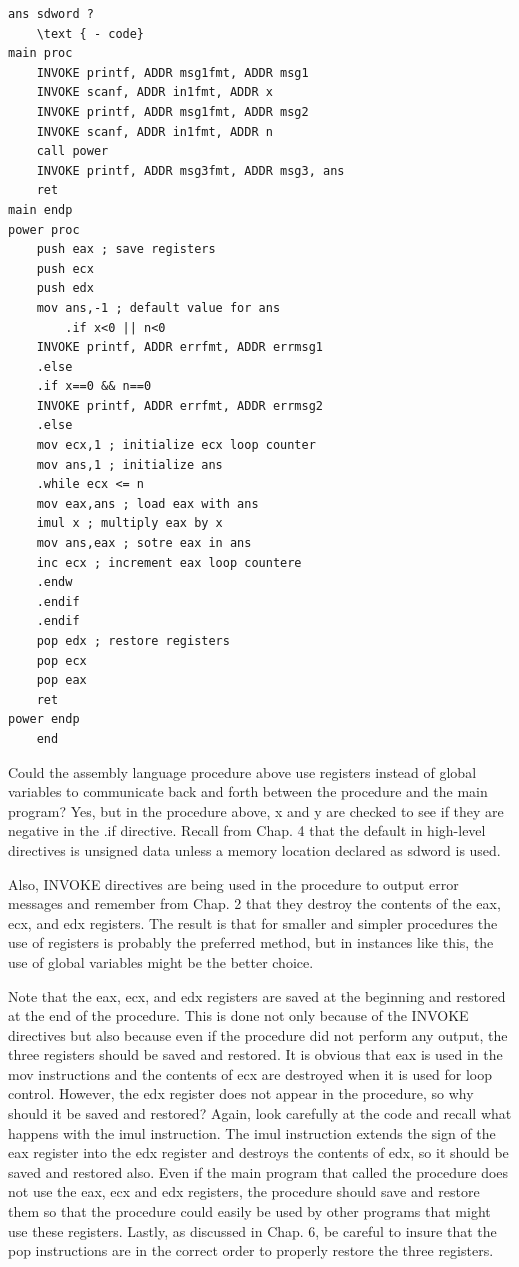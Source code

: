 \documentclass[10pt]{book}
\begin{document}
\begin{verbatim}
ans sdword ?
    \text { - code}
main proc
    INVOKE printf, ADDR msg1fmt, ADDR msg1
    INVOKE scanf, ADDR in1fmt, ADDR x
    INVOKE printf, ADDR msg1fmt, ADDR msg2
    INVOKE scanf, ADDR in1fmt, ADDR n
    call power
    INVOKE printf, ADDR msg3fmt, ADDR msg3, ans
    ret
main endp
power proc
    push eax ; save registers
    push ecx
    push edx
    mov ans,-1 ; default value for ans
        .if x<0 || n<0
    INVOKE printf, ADDR errfmt, ADDR errmsg1
    .else
    .if x==0 && n==0
    INVOKE printf, ADDR errfmt, ADDR errmsg2
    .else
    mov ecx,1 ; initialize ecx loop counter
    mov ans,1 ; initialize ans
    .while ecx <= n
    mov eax,ans ; load eax with ans
    imul x ; multiply eax by x
    mov ans,eax ; sotre eax in ans
    inc ecx ; increment eax loop countere
    .endw
    .endif
    .endif
    pop edx ; restore registers
    pop ecx
    pop eax
    ret
power endp
    end
\end{verbatim}

Could the assembly language procedure above use registers instead of global variables to communicate back and forth between the procedure and the main program? Yes, but in the procedure above, x and y are checked to see if they are negative in the .if directive. Recall from Chap. 4 that the default in high-level directives is unsigned data unless a memory location declared as sdword is used.

Also, INVOKE directives are being used in the procedure to output error messages and remember from Chap. 2 that they destroy the contents of the eax, ecx, and edx registers. The result is that for smaller and simpler procedures the use of registers is probably the preferred method, but in instances like this, the use of global variables might be the better choice.

Note that the eax, ecx, and edx registers are saved at the beginning and restored at the end of the procedure. This is done not only because of the INVOKE directives but also because even if the procedure did not perform any output, the three registers should be saved and restored. It is obvious that eax is used in the mov instructions and the contents of ecx are destroyed when it is used for loop control. However, the edx register does not appear in the procedure, so why should it be saved and restored? Again, look carefully at the code and recall what happens with the imul instruction. The imul instruction extends the sign of the eax register into the edx register and destroys the contents of edx, so it should be saved and restored also. Even if the main program that called the procedure does not use the eax, ecx and edx registers, the procedure should save and restore them so that the procedure could easily be used by other programs that might use these registers. Lastly, as discussed in Chap. 6, be careful to insure that the pop instructions are in the correct order to properly restore the three registers.
\end{document}
